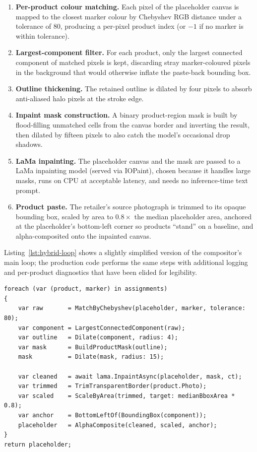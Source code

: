 \begin{enumerate}
\item[\textbf{(a)}] \textbf{Per-product colour matching.} Each pixel of the placeholder canvas is mapped to the closest marker colour by Chebyshev RGB distance under a tolerance of $80$, producing a per-pixel product index (or $-1$ if no marker is within tolerance).
\item[\textbf{(b)}] \textbf{Largest-component filter.} For each product, only the largest connected component of matched pixels is kept, discarding stray marker-coloured pixels in the background that would otherwise inflate the paste-back bounding box.
\item[\textbf{(c)}] \textbf{Outline thickening.} The retained outline is dilated by four pixels to absorb anti-aliased halo pixels at the stroke edge.
\item[\textbf{(d)}] \textbf{Inpaint mask construction.} A binary product-region mask is built by flood-filling unmatched cells from the canvas border and inverting the result, then dilated by fifteen pixels to also catch the model's occasional drop shadows.
\item[\textbf{(e)}] \textbf{LaMa inpainting.} The placeholder canvas and the mask are passed to a LaMa inpainting model \cite{suvorov2022lama} (served via IOPaint), chosen because it handles large masks, runs on CPU at acceptable latency, and needs no inference-time text prompt.
\item[\textbf{(f)}] \textbf{Product paste.} The retailer's source photograph is trimmed to its opaque bounding box, scaled by area to $0.8\times$ the median placeholder area, anchored at the placeholder's bottom-left corner so products ``stand'' on a baseline, and alpha-composited onto the inpainted canvas.
\end{enumerate}

Listing~\ref{lst:hybrid-loop} shows a slightly simplified version of the compositor's main loop; the production code performs the same steps with additional logging and per-product diagnostics that have been elided for legibility.

\begin{lstlisting}[style=csharp, caption={Per-product compositing loop (simplified).}, label={lst:hybrid-loop}]
foreach (var (product, marker) in assignments)
{
    var raw       = MatchByChebyshev(placeholder, marker, tolerance: 80);
    var component = LargestConnectedComponent(raw);
    var outline   = Dilate(component, radius: 4);
    var mask      = BuildProductMask(outline);
    mask          = Dilate(mask, radius: 15);

    var cleaned   = await lama.InpaintAsync(placeholder, mask, ct);
    var trimmed   = TrimTransparentBorder(product.Photo);
    var scaled    = ScaleByArea(trimmed, target: medianBboxArea * 0.8);
    var anchor    = BottomLeftOf(BoundingBox(component));
    placeholder   = AlphaComposite(cleaned, scaled, anchor);
}
return placeholder;
\end{lstlisting}

